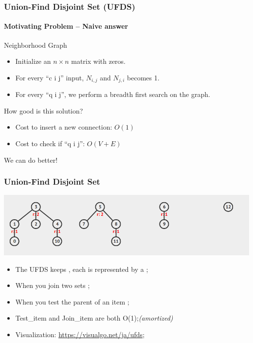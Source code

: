 \begin{frame}
  \frametitle{Union-Find Disjoint Set (UFDS)}
  \framesubtitle{Motivating Problem -- Naive answer}

  \begin{block}{Neighborhood Graph}
    \begin{itemize}
    \item Initialize an $n\times n$ matrix with zeros.
    \item For every ``c i j'' input, $N_{i,j}$ and $N_{j,i}$ becomes 1.
    \item For every ``q i j'', we perform a breadth first search on the graph.
    \end{itemize}
  \end{block}


  \bigskip

  How good is this solution?
  \begin{itemize}
  \item Cost to insert a new connection: $O(1)$
  \item Cost to check if ``q i j'': $O(V+E)$
  \end{itemize}

  \bigskip We can do better!
\end{frame}

\begin{frame}
  \frametitle{Union-Find Disjoint Set}

  \begin{center}
    \includegraphics[width=.9\textwidth]{img/ufds1}
  \end{center}

  \begin{itemize}
  \item The UFDS keeps , each is represented by a ;
  \item When you join two sets ;
  \item When you test the parent of an item ;
  \item Test\_item and Join\_item are both O(1);\hfill \emph{(amortized)}
  \item Visualization: \url{https://visualgo.net/ja/ufds};
  \end{itemize}
\end{frame}

